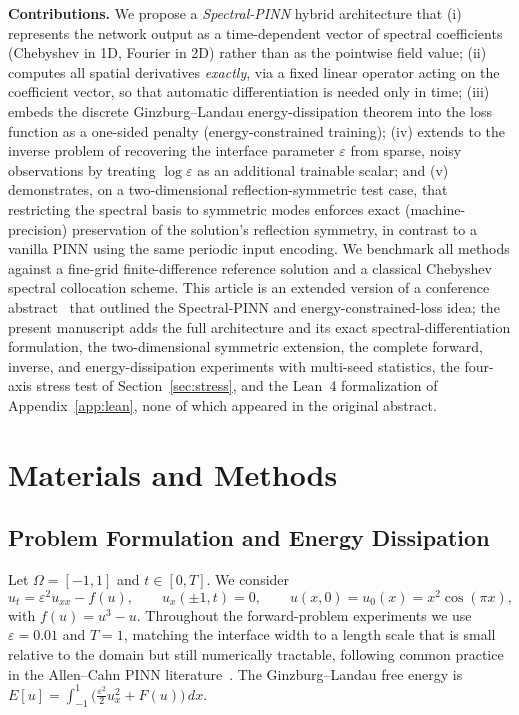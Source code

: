 \documentclass[symmetry,article,submit,moreauthors]{Definitions/mdpi}
\begin{document}
\textbf{Contributions.} We propose a \emph{Spectral-PINN} hybrid architecture that (i) represents the network output as a time-dependent vector of spectral coefficients (Chebyshev in 1D, Fourier in 2D) rather than as the pointwise field value; (ii) computes all spatial derivatives \emph{exactly}, via a fixed linear operator acting on the coefficient vector, so that automatic differentiation is needed only in time; (iii) embeds the discrete Ginzburg--Landau energy-dissipation theorem into the loss function as a one-sided penalty (energy-constrained training); (iv) extends to the inverse problem of recovering the interface parameter $\varepsilon$ from sparse, noisy observations by treating $\log\varepsilon$ as an additional trainable scalar; and (v) demonstrates, on a two-dimensional reflection-symmetric test case, that restricting the spectral basis to symmetric modes enforces exact (machine-precision) preservation of the solution's reflection symmetry, in contrast to a vanilla PINN using the same periodic input encoding. We benchmark all methods against a fine-grid finite-difference reference solution and a classical Chebyshev spectral collocation scheme. This article is an extended version of a conference abstract~\cite{ICCMA2026abstract} that outlined the Spectral-PINN and energy-constrained-loss idea; the present manuscript adds the full architecture and its exact spectral-differentiation formulation, the two-dimensional symmetric extension, the complete forward, inverse, and energy-dissipation experiments with multi-seed statistics, the four-axis stress test of Section~\ref{sec:stress}, and the Lean~4 formalization of Appendix~\ref{app:lean}, none of which appeared in the original abstract.

\section{Materials and Methods}

\subsection{Problem Formulation and Energy Dissipation}\label{sec:problem}

Let $\Omega=[-1,1]$ and $t\in[0,T]$. We consider
\begin{equation}\label{eq:AC}
u_t = \varepsilon^2 u_{xx} - f(u), \qquad u_x(\pm1,t)=0, \qquad u(x,0)=u_0(x)=x^2\cos(\pi x),
\end{equation}
with $f(u)=u^3-u$. Throughout the forward-problem experiments we use $\varepsilon=0.01$ and $T=1$, matching the interface width to a length scale that is small relative to the domain but still numerically tractable, following common practice in the Allen--Cahn PINN literature~\cite{Wight,Mattey}. The Ginzburg--Landau free energy is $E[u]=\int_{-1}^{1}\bigl(\frac{\varepsilon^2}{2}u_x^2+F(u)\bigr)\,dx$.
\end{document}
